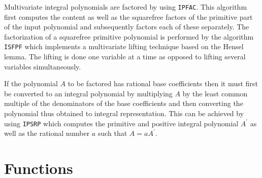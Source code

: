 Multivariate integral polynomials are factored by using {\tt IPFAC}.
This algorithm first computes the content as well as the squarefree
factors of the primitive part of the input polynomial and subsequently
factors each of these separately. The factorization of a squarefree
primitive polynomial is performed by the algorithm {\tt ISFPF} which
implements a multivariate lifting technique based on the Hensel lemma.
The lifting is done one variable at a time as opposed to lifting
several variables simultaneously.

If the polynomial $A$ to be factored has rational base coefficients
then it must first be converted to an integral polynomial by
multiplying $A$ by the least common multiple of the denominators of
the base coefficients and then converting the polynomial thus obtained
to integral representation.  This can be achieved by using {\tt IPSRP}
which computes the primitive and positive integral polynomial
$A^{\prime}$ as well as the rational number $a$ such that $A = a
A^{\prime}$.

\section{Functions}

